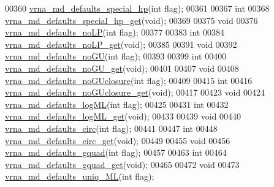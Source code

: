 \begin{DoxyCode}
00360 \hyperlink{group__model__details_gafff6449a02744add0308e653230c15fc}{vrna\_md\_defaults\_special\_hp}(\textcolor{keywordtype}{int} flag);
00361 
00367 \textcolor{keywordtype}{int}
00368 \hyperlink{group__model__details_ga1d68a6efdaa1253cc63fd9cd06452559}{vrna\_md\_defaults\_special\_hp\_get}(\textcolor{keywordtype}{void});
00369 
00375 \textcolor{keywordtype}{void}
00376 \hyperlink{group__model__details_ga2f88ffc393ac9d7987849c965fd29ea8}{vrna\_md\_defaults\_noLP}(\textcolor{keywordtype}{int} flag);
00377 
00383 \textcolor{keywordtype}{int}
00384 \hyperlink{group__model__details_ga934344888fbacaed538bbbfe910f2aa6}{vrna\_md\_defaults\_noLP\_get}(\textcolor{keywordtype}{void});
00385 
00391 \textcolor{keywordtype}{void}
00392 \hyperlink{group__model__details_ga98218f85c7a957a1d1ddf4627fdf5a39}{vrna\_md\_defaults\_noGU}(\textcolor{keywordtype}{int} flag);
00393 
00399 \textcolor{keywordtype}{int}
00400 \hyperlink{group__model__details_ga5faa7d4e536d7fe36ec25428c0cf2563}{vrna\_md\_defaults\_noGU\_get}(\textcolor{keywordtype}{void});
00401 
00407 \textcolor{keywordtype}{void}
00408 \hyperlink{group__model__details_gade5b9951d71ca2fb357a4e6c0c18ccd1}{vrna\_md\_defaults\_noGUclosure}(\textcolor{keywordtype}{int} flag);
00409 
00415 \textcolor{keywordtype}{int}
00416 \hyperlink{group__model__details_ga4f7fdad083243a5348d63320ddaa70f3}{vrna\_md\_defaults\_noGUclosure\_get}(\textcolor{keywordtype}{void});
00417 
00423 \textcolor{keywordtype}{void}
00424 \hyperlink{group__model__details_ga3de50a73455d88c3957386933b8e1f90}{vrna\_md\_defaults\_logML}(\textcolor{keywordtype}{int} flag);
00425 
00431 \textcolor{keywordtype}{int}
00432 \hyperlink{group__model__details_ga93f04e070d529c5d0bb87c9681f6ad29}{vrna\_md\_defaults\_logML\_get}(\textcolor{keywordtype}{void});
00433 
00439 \textcolor{keywordtype}{void}
00440 \hyperlink{group__model__details_ga4e1deb3e91a8a99e5c6dd905a5eb0186}{vrna\_md\_defaults\_circ}(\textcolor{keywordtype}{int} flag);
00441 
00447 \textcolor{keywordtype}{int}
00448 \hyperlink{group__model__details_gad3a7e58de344ad93a08925f58f94f6fb}{vrna\_md\_defaults\_circ\_get}(\textcolor{keywordtype}{void});
00449 
00455 \textcolor{keywordtype}{void}
00456 \hyperlink{group__model__details_ga0685ca2aeb39af76f2421fc308163dce}{vrna\_md\_defaults\_gquad}(\textcolor{keywordtype}{int} flag);
00457 
00463 \textcolor{keywordtype}{int}
00464 \hyperlink{group__model__details_gae645b8612f879eb38b45244fa9eddb9e}{vrna\_md\_defaults\_gquad\_get}(\textcolor{keywordtype}{void});
00465 
00472 \textcolor{keywordtype}{void}
00473 \hyperlink{group__model__details_ga59b944f61c5d2babec2d4c48c820de67}{vrna\_md\_defaults\_uniq\_ML}(\textcolor{keywordtype}{int} flag);

\end{DoxyCode}

